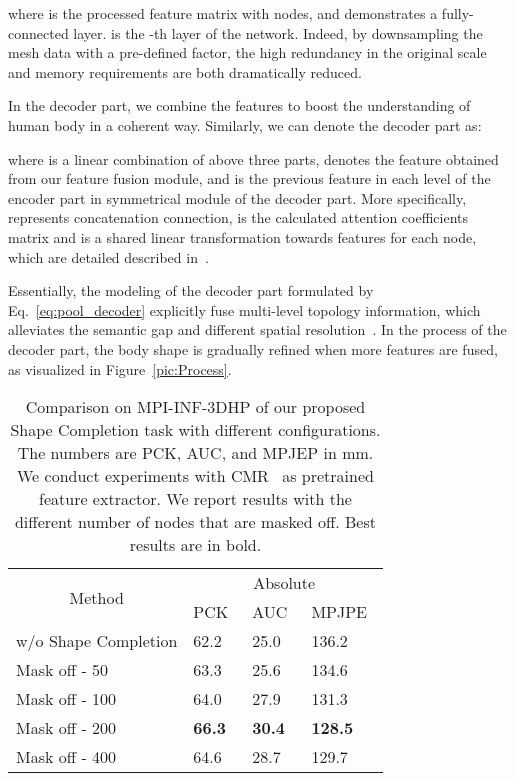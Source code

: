 \documentclass[sigplan]{acmart}
\begin{document}
where  is the processed feature matrix with  nodes, and  demonstrates a fully-connected layer.  is the -th layer of the network. Indeed, by downsampling the mesh data with a pre-defined factor, the high redundancy in the original scale and memory requirements are both dramatically reduced.

In the decoder part, we combine the features to boost the understanding of human body in a coherent way. Similarly, we can denote the decoder part as:

where  is a linear combination of above three parts,  denotes the feature obtained from our feature fusion module, and  is the previous feature in each level of the encoder part in symmetrical module of the decoder part. More specifically,  represents concatenation connection,  is the calculated attention coefficients matrix and  is a shared linear transformation towards  features for each node, which are detailed described in~\cite{velickovic2018graph}.

Essentially, the modeling of the decoder part formulated by Eq.~\eqref{eq:pool_decoder} explicitly fuse multi-level topology information, which alleviates the semantic gap and different spatial resolution~\cite{Qin_2020_PR}. In the process of the decoder part, the body shape is gradually refined when more features are fused, as visualized in Figure~\ref{pic:Process}. 


\begin{table}[!t]
\caption{Comparison on MPI-INF-3DHP of our proposed Shape Completion task with different configurations. The numbers are PCK, AUC, and MPJEP in mm. We conduct experiments with CMR~\cite{kolotouros2019convolutional} as pretrained feature extractor. We report results with the different number of nodes that are masked off. Best results are in bold.}
\centering
\begin{tabular}{ccccccccccccccc}
\hline
\multicolumn{3}{c|}{\multirow{2}{*}{Method}} & \multicolumn{12}{c}{Absolute} \\ 
\cline{4-15} 
\multicolumn{3}{c}{}                        & \multicolumn{4}{|l}{PCK~} & \multicolumn{4}{l}{AUC~} & \multicolumn{4}{l}{MPJPE~}  \\ \hline
\multicolumn{3}{l|}{w/o Shape Completion}         &
\multicolumn{4}{l}{62.2} & 
\multicolumn{4}{l}{25.0} & 
\multicolumn{4}{l}{136.2}  \\ 
\multicolumn{3}{l|}{Mask off - 50}                        &  
\multicolumn{4}{l}{63.3} & 
\multicolumn{4}{l}{25.6} & 
\multicolumn{4}{l}{134.6}  \\ 
\multicolumn{3}{l|}{Mask off - 100}                        & 
\multicolumn{4}{l}{64.0} & 
\multicolumn{4}{l}{27.9} & 
\multicolumn{4}{l}{{131.3}}  \\ 
\multicolumn{3}{l|}{Mask off - 200}                        &  
\multicolumn{4}{l}{\textbf{66.3}} & 
\multicolumn{4}{l}{\textbf{30.4}} & 
\multicolumn{4}{l}{\textbf{128.5}}  \\ 
\multicolumn{3}{l|}{Mask off - 400}                        & \multicolumn{4}{l}{64.6} & 
\multicolumn{4}{l}{28.7} & 
\multicolumn{4}{l}{129.7}  \\ 
\hline
\end{tabular}
\label{table4shape}
\end{table}
\end{document}
